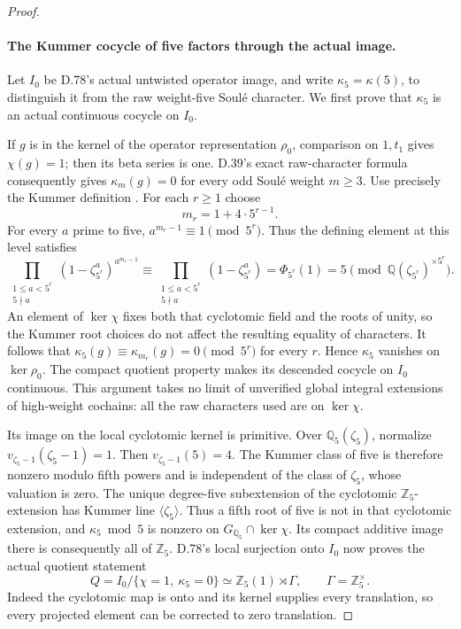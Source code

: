 \begin{proof}
\paragraph{The Kummer cocycle of five factors through the actual image.}
Let \(I_0\) be D.78's actual untwisted operator image, and
write \(\kappa_5=\kappa(5)\), to distinguish it from the raw
weight-five Soul\'e character. We first prove that \(\kappa_5\)
is an actual continuous cocycle on \(I_0\).

If \(g\) is in the kernel of the operator representation
\(\rho_0\), comparison on \(1,t_1\) gives \(\chi(g)=1\);
then its beta series is one. D.39's exact raw-character
formula consequently gives
\(\kappa_m(g)=0\) for every odd Soul\'e weight \(m\ge3\).
Use precisely the Kummer definition
\cite[(1.1)--(1.2)]{DE_NakamuraSakugawaWojtkowiak2017}.
For each \(r\ge1\) choose
\[
                 m_r=1+4\cdot5^{r-1}.
                                                               \tag{D.82.5}
\]
For every \(a\) prime to five, \(a^{m_r-1}\equiv1\pmod{5^r}\).
Thus the defining element at this level satisfies
\[
 \prod_{\substack{1\le a<5^r\\5\nmid a}}
      (1-\zeta_{5^r}^{a})^{a^{m_r-1}}
       \equiv
 \prod_{\substack{1\le a<5^r\\5\nmid a}}
      (1-\zeta_{5^r}^{a})
       =\Phi_{5^r}(1)=5
       \pmod{\mathbb Q(\zeta_{5^r})^{\times 5^r}}.
                                                               \tag{D.82.6}
\]
An element of \(\ker\chi\) fixes both that cyclotomic field
and the roots of unity, so the Kummer root choices do not
affect the resulting equality of characters.
It follows that
\(\kappa_5(g)\equiv\kappa_{m_r}(g)=0\pmod{5^r}\) for every \(r\).
Hence \(\kappa_5\) vanishes on \(\ker\rho_0\).
The compact quotient property makes its descended cocycle
on \(I_0\) continuous. This argument takes no limit of
unverified global integral extensions of high-weight cochains:
all the raw characters used are on \(\ker\chi\).

Its image on the local cyclotomic kernel is primitive.
Over \(\mathbb Q_5(\zeta_5)\), normalize
\(v_{\zeta_5-1}(\zeta_5-1)=1\). Then \(v_{\zeta_5-1}(5)=4\).
The Kummer class of five is therefore nonzero modulo fifth
powers and is independent of the class of \(\zeta_5\), whose
valuation is zero. The unique degree-five subextension of
the cyclotomic \(\mathbb Z_5\)-extension has Kummer line
\(\langle\zeta_5\rangle\). Thus a fifth root of five is not
in that cyclotomic extension, and \(\kappa_5\bmod5\) is nonzero
on \(G_{\mathbb Q_5}\cap\ker\chi\). Its compact additive image
there is consequently all of \(\mathbb Z_5\).
D.78's local surjection onto \(I_0\) now proves the actual
quotient statement
\[
 Q=I_0/\{\chi=1,\ \kappa_5=0\}
       \simeq\mathbb Z_5(1)\rtimes\Gamma,\qquad
                  \Gamma=\mathbb Z_5^\times .
                                                               \tag{D.82.7}
\]
Indeed the cyclotomic map is onto and its kernel supplies
every translation, so every projected element can be
corrected to zero translation.


\end{proof}
